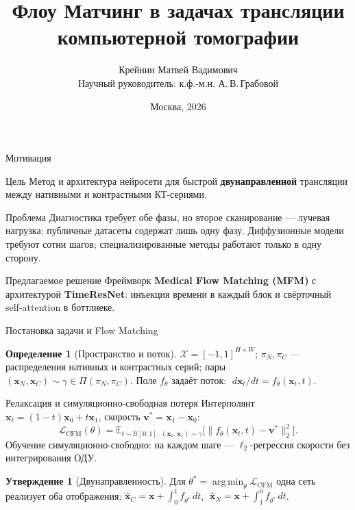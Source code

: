 \documentclass[aspectratio=43]{beamer}
\title[Флоу Матчинг для трансляции КТ]{Флоу Матчинг в задачах трансляции\\компьютерной томографии}
\author[Крейнин М.\,В.]{Крейнин Матвей Вадимович\texorpdfstring{\\[4pt]{\small Научный руководитель: к.ф.-м.н. А.\,В.\,Грабовой}}{}}
\institute[МФТИ]{%
  Московский физико-технический институт\\
  Физтех-школа прикладной математики и информатики\\
  Кафедра интеллектуального анализа данных ВЦ РАН\\[2pt]
  {\small 09.04.01 --- Информатика и вычислительная техника}}
\date{Москва, 2026}
\theoremstyle{definition}
\newtheorem{defn}{Определение}
\newtheorem{prop}{Утверждение}
\DeclareMathOperator*{\argmin}{arg\,min}
\begin{document}
\begin{frame}[plain]
  \titlepage
\end{frame}

\begin{frame}{Мотивация}

\begin{block}{Цель}
Метод и архитектура нейросети для быстрой \textbf{двунаправленной} трансляции между нативными и контрастными КТ-сериями.
\end{block}

\begin{alertblock}{Проблема}
Диагностика требует обе фазы, но второе сканирование --- лучевая нагрузка; публичные датасеты содержат лишь одну фазу. Диффузионные модели требуют сотни шагов; специализированные методы работают только в одну сторону.
\end{alertblock}

\begin{exampleblock}{Предлагаемое решение}
Фреймворк \textbf{Medical Flow Matching (MFM)} с архитектурой \textbf{TimeResNet}: инъекция времени в каждый блок и свёрточный self-attention в боттлнеке.
\end{exampleblock}

\end{frame}

\begin{frame}{Постановка задачи и Flow Matching}
\footnotesize

\begin{defn}[Пространство и поток]
$\mathcal{X}=[-1,1]^{H\times W}$; $\pi_N,\pi_C$ --- распределения нативных и контрастных серий; пары $(\mathbf{x}_N,\mathbf{x}_C)\sim\gamma\in\Pi(\pi_N,\pi_C)$. Поле $f_\theta$ задаёт поток: $\;d\mathbf{x}_t/dt=f_\theta(\mathbf{x}_t,t)$.
\end{defn}

\vspace{-0.12cm}
\begin{block}{Релаксация и симуляционно-свободная потеря}
Интерполянт $\mathbf{x}_t=(1-t)\mathbf{x}_0+t\mathbf{x}_1$, скорость $\mathbf{v}^*=\mathbf{x}_1-\mathbf{x}_0$:
\[
  \mathcal{L}_{\mathrm{CFM}}(\theta)=\mathbb{E}_{t\sim\mathcal{U}[0,1],\,(\mathbf{x}_0,\mathbf{x}_1)\sim\gamma}\bigl[\lVert f_\theta(\mathbf{x}_t,t)-\mathbf{v}^*\rVert_2^2\bigr].
\]
Обучение симуляционно-свободно: на каждом шаге --- $\ell_2$-регрессия скорости без интегрирования ОДУ.
\end{block}

\vspace{-0.12cm}
\begin{prop}[Двунаправленность]
Для $\theta^*=\argmin_\theta\mathcal{L}_{\mathrm{CFM}}$ одна сеть реализует оба отображения: $\hat{\mathbf{x}}_C=\mathbf{x}+\int_0^1 f_{\theta^*}\,dt$, $\;\hat{\mathbf{x}}_N=\mathbf{x}+\int_1^0 f_{\theta^*}\,dt$.
\end{prop}

\end{frame}
\end{document}
